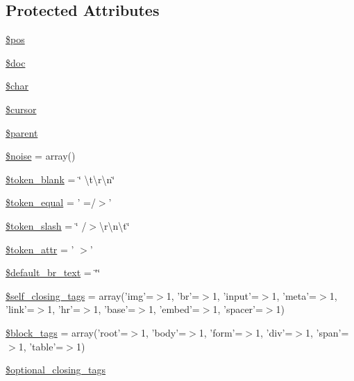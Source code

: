\subsection*{Protected Attributes}
\begin{DoxyCompactItemize}
\item 
\hyperlink{classsimple__html__dom_a5de51f0c80b3bb3b39a57b23f6b9ea9f}{\$pos}
\item 
\hyperlink{classsimple__html__dom_afc5e9ce512cd97cf2e0e25bb20dcd39b}{\$doc}
\item 
\hyperlink{classsimple__html__dom_a128242871482e787498df34c33223f14}{\$char}
\item 
\hyperlink{classsimple__html__dom_a256b6d58b346bcd39d5bf5d49de70df2}{\$cursor}
\item 
\hyperlink{classsimple__html__dom_a4e2313a4b35b72a06ac45fd38960f677}{\$parent}
\item 
\hyperlink{classsimple__html__dom_a2774f17621ab4d3b64411f86c88df407}{\$noise} = array()
\item 
\hyperlink{classsimple__html__dom_ab7f68c12b4913a3685778154760151cd}{\$token\+\_\+blank} = \char`\"{} \textbackslash{}t\textbackslash{}r\textbackslash{}n\char`\"{}
\item 
\hyperlink{classsimple__html__dom_a554179de2a5fb6395ce5ec3ff38f3169}{\$token\+\_\+equal} = ' =/$>$'
\item 
\hyperlink{classsimple__html__dom_a6e9298d28dc391aa70939916476fd4d1}{\$token\+\_\+slash} = \char`\"{} /$>$\textbackslash{}r\textbackslash{}n\textbackslash{}t\char`\"{}
\item 
\hyperlink{classsimple__html__dom_a0fb7a78d4e17bb7d156df4f5b79c4d30}{\$token\+\_\+attr} = ' $>$'
\item 
\hyperlink{classsimple__html__dom_abd3661f931d84bc5e904cfd8e8e00833}{\$default\+\_\+br\+\_\+text} = \char`\"{}\char`\"{}
\item 
\hyperlink{classsimple__html__dom_af36f0e679f54f7ee558dd5b96d4b8727}{\$self\+\_\+closing\+\_\+tags} = array('img'=$>$1, 'br'=$>$1, 'input'=$>$1, 'meta'=$>$1, 'link'=$>$1, 'hr'=$>$1, 'base'=$>$1, 'embed'=$>$1, 'spacer'=$>$1)
\item 
\hyperlink{classsimple__html__dom_ac513b8dc3142f886d0609b7893fe6026}{\$block\+\_\+tags} = array('root'=$>$1, 'body'=$>$1, 'form'=$>$1, 'div'=$>$1, 'span'=$>$1, 'table'=$>$1)
\item 
\hyperlink{classsimple__html__dom_a0aa8137deceff2940ae24f30bdb37379}{\$optional\+\_\+closing\+\_\+tags}
\end{DoxyCompactItemize}


